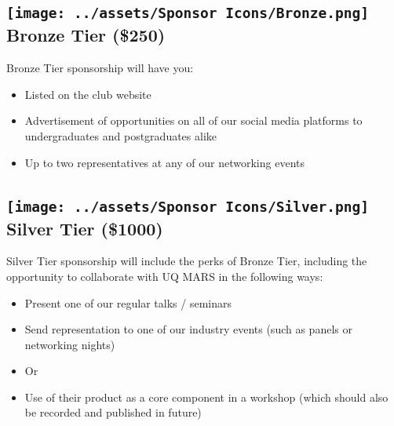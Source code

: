 \documentclass[a4paper,12pt]{report}
\begin{document}
\subsection*{
    \texttt{[image: ../assets/Sponsor Icons/Bronze.png]}
    \textcolor{sponsor_bronze}{Bronze Tier (\$250)}
}
Bronze Tier sponsorship will have you:
\begin{itemize}
    \item Listed on the club website
    \item Advertisement of opportunities on all of our social media platforms to undergraduates and postgraduates alike
    \item Up to two representatives at any of our networking events
\end{itemize}

\subsection*{
    \texttt{[image: ../assets/Sponsor Icons/Silver.png]}
    \textcolor{sponsor_silver}{Silver Tier (\$1000)}
}
Silver Tier sponsorship will include the perks of Bronze Tier, including the opportunity to collaborate with UQ MARS in the following ways:
\begin{itemize}
    \item Present one of our regular talks / seminars
    \item Send representation to one of our industry events (such as panels or networking nights)
    \item Or
    \item Use of their product as a core component in a workshop (which should also be recorded and published in future)
\end{itemize}
\end{document}
